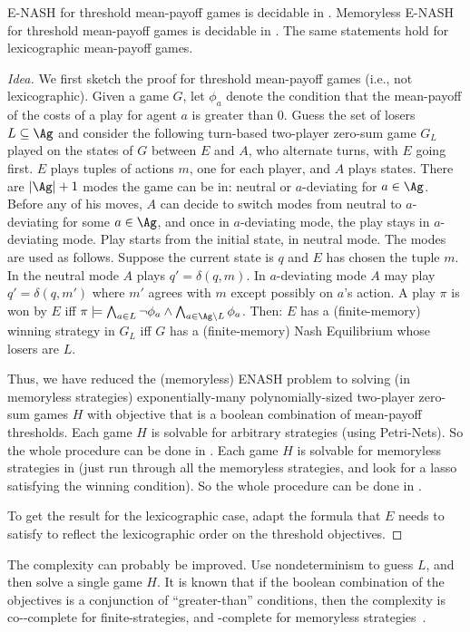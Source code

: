 \begin{conjecture} \label{conj:ENASH-mpgs}
E-NASH for threshold mean-payoff games is decidable in \expspace.
Memoryless E-NASH for threshold mean-payoff games is decidable in \exptime. The same statements hold for lexicographic mean-payoff games.
\end{conjecture}
\begin{proof}[Idea]
 We first sketch the proof for threshold mean-payoff games (i.e., not lexicographic).
 Given a game $G$, let $\phi_a$ denote the condition that the mean-payoff of the costs of a play for agent $a$ is greater than $0$. 
 Guess the set of losers $L \subseteq \Ag$ and consider the following turn-based two-player zero-sum game $G_L$ played on the states of $G$
 between $E$ and $A$, who alternate turns, with $E$ going first. $E$ plays tuples of actions $m$, one for each player,  
 and $A$ plays states.  There are $|\Ag|+1$ modes the game can be in: neutral or $a$-deviating for $a \in \Ag$. Before any of his moves, $A$ can decide to switch modes from neutral to $a$-deviating for some $a \in \Ag$, and once in $a$-deviating mode, the play stays in $a$-deviating mode.  Play starts from the initial state, in neutral mode. The modes are used as follows. Suppose the current state is $q$ and $E$ has chosen the tuple $m$. 
In the neutral mode $A$ plays $q' = \delta(q,m)$. In $a$-deviating mode $A$ may play $q' = \delta(q,m')$ where $m'$ agrees with $m$ except possibly on $a$'s action. A play $\pi$ is won by $E$ iff 
 $\pi \models \bigwedge_{a \in L} \neg \phi_a \wedge \bigwedge_{a \in \Ag \setminus L} \phi_a$. Then: $E$ has a (finite-memory) winning strategy in $G_L$ iff $G$ has a (finite-memory)  Nash Equilibrium whose losers are $L$.
 
 Thus, we have reduced the (memoryless) ENASH problem to solving (in memoryless strategies) exponentially-many polynomially-sized two-player zero-sum games $H$ with objective that is a boolean combination of mean-payoff thresholds. Each game $H$ is solvable for arbitrary strategies \expspace (using Petri-Nets). So the whole procedure can be done in \expspace.
 Each game $H$ is solvable for memoryless strategies in \exptime (just run through all the memoryless strategies, and look for a lasso satisfying the winning condition). So the whole procedure can be done in \exptime.
 
 To get the result for the lexicographic case, adapt the formula that $E$ needs to satisfy to reflect the lexicographic order on the threshold objectives.
\end{proof}
The complexity can probably be improved. Use nondeterminism to guess $L$, and then solve a single game $H$. It is known that if the boolean combination of the objectives is a conjunction of ``greater-than'' conditions, then the complexity is co-\np-complete for finite-strategies, and \np-complete for memoryless strategies~\cite{DBLP:conf/fsttcs/ChatterjeeDHR10}. 


